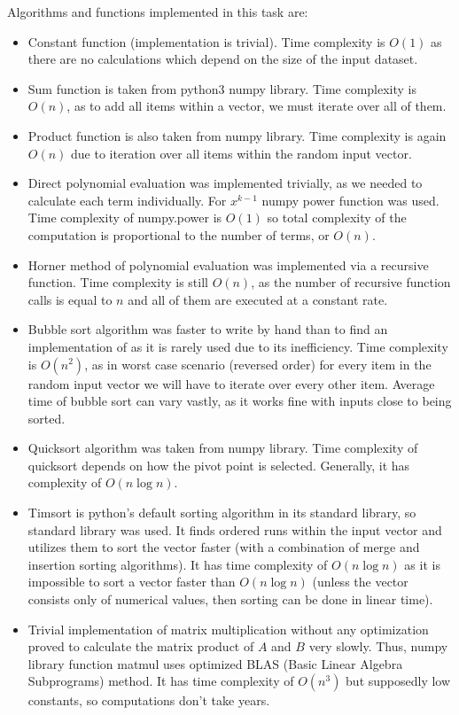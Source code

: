 \documentclass[12pt, a4paper]{article}
\begin{document}
Algorithms and functions implemented in this task are:
\begin{itemize}
	\item Constant function (implementation is trivial). Time complexity is $O(1)$ as there are no calculations which depend on the size of the input dataset.
	\item Sum function is taken from python3 numpy library. Time complexity is $O(n)$, as to add all items within a vector, we must iterate over all of them.
	\item Product function is also taken from numpy library. Time complexity is again $O(n)$ due to iteration over all items within the random input vector.
	\item Direct polynomial evaluation was implemented trivially, as we needed to calculate each term individually. For $x^{k-1}$ numpy power function was used. Time complexity of numpy.power is $O(1)$ so total complexity of the computation is proportional to the number of terms, or $O(n)$.
	\item Horner method of polynomial evaluation was implemented via a recursive function. Time complexity is still $O(n)$, as the number of recursive function calls is equal to $n$ and all of them are executed at a constant rate.
	\item Bubble sort algorithm was faster to write by hand than to find an implementation of as it is rarely used due to its inefficiency. Time complexity is $O(n^2)$, as in worst case scenario (reversed order) for every item in the random input vector we will have to iterate over every other item. Average time of bubble sort can vary vastly, as it works fine with inputs close to being sorted.
	\item Quicksort algorithm was taken from numpy library. Time complexity of quicksort depends on how the pivot point is selected. Generally, it has complexity of $O(n \log n)$.
	\item Timsort is python's default sorting algorithm in its standard library, so standard library was used. It finds ordered runs within the input vector and utilizes them to sort the vector faster (with a combination of merge and insertion sorting algorithms). It has time complexity of $O(n \log n)$ as it is impossible to sort a vector faster than $O(n \log n)$ (unless the vector consists only of numerical values, then sorting can be done in linear time).
	\item Trivial implementation of matrix multiplication without any optimization proved to calculate the matrix product of $A$ and $B$ very slowly. Thus, numpy library function matmul uses optimized BLAS (Basic Linear Algebra Subprograms) method. It has time complexity of $O(n^3)$ but supposedly low constants, so computations don't take years.
\end{itemize}
\end{document}
